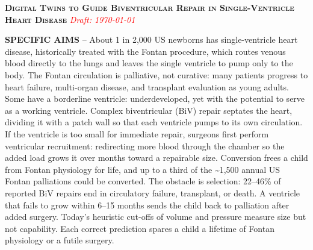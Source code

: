 


\centerline{\textbf{\textsc{Digital Twins to Guide Biventricular Repair in Single-Ventricle Heart Disease}}
\textcolor{red}{\it \scriptsize Draft: \today}
}

\textbf{SPECIFIC AIMS} -- About 1 in 2,000 US newborns has single-ventricle heart disease, historically treated with the Fontan procedure, which routes venous blood directly to the lungs and leaves the single ventricle to pump only to the body\cite{khairy2007_univentricularHeart}. The Fontan circulation is palliative, not curative: many patients progress to heart failure, multi-organ disease, and transplant evaluation as young adults\cite{khairy2008_longtermSurvivalFontan}. Some have a borderline ventricle: underdeveloped, yet with the potential to serve as a working ventricle\cite{lam2025_borderlineVentricleReview}. Complex biventricular (BiV) repair septates the heart, dividing it with a patch wall so that each ventricle pumps to its own circulation\cite{andersen2020_BiVrepair}. If the ventricle is too small for immediate repair, surgeons first perform ventricular recruitment: redirecting more blood through the chamber so the added load grows it over months toward a repairable size. Conversion frees a child from Fontan physiology for life, and up to a third of the \textasciitilde{}1,500 annual US Fontan palliations could be converted. The obstacle is selection: 22--46\% of reported BiV repairs end in circulatory failure, transplant, or death\cite{herrin2017_BiV_clinicalPredict,beattie202_BiV,barry2018_aorticStenosis_BiV}. A ventricle that fails to grow within 6--15 months sends the child back to palliation after added surgery. Today's heuristic cut-offs of volume and pressure measure size but not capability.  Each correct prediction spares a child a lifetime of Fontan physiology or a futile surgery.

